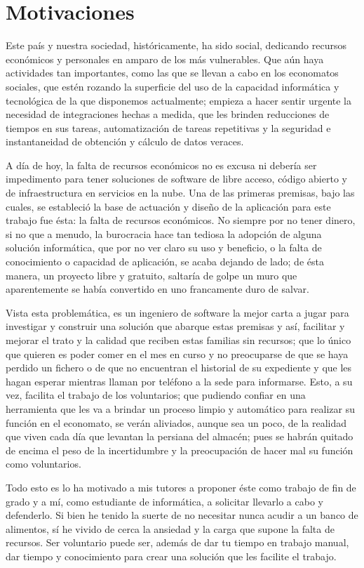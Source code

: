 \section{Motivaciones}
Este país y nuestra sociedad, históricamente, ha sido social, dedicando recursos económicos y personales en amparo de los más vulnerables. Que aún haya actividades tan importantes, como las que se llevan a cabo en los economatos sociales, que estén rozando la superficie del uso de la capacidad informática y tecnológica de la que disponemos actualmente; empieza a hacer sentir urgente la necesidad de integraciones hechas a medida, que les brinden reducciones de tiempos en sus tareas, automatización de tareas repetitivas y la seguridad e instantaneidad de obtención y cálculo de datos veraces.
\vspace{1em}
\par A día de hoy, la falta de recursos económicos no es excusa ni debería ser impedimento para tener soluciones de software de libre acceso, código abierto y de infraestructura en servicios en la nube. Una de las primeras premisas, bajo las cuales, se estableció la base de actuación y diseño de la aplicación para este trabajo fue ésta: la falta de recursos económicos. No siempre por no tener dinero, si no que a menudo, la burocracia hace tan tediosa la adopción de alguna solución informática, que por no ver claro su uso y beneficio, o la falta de conocimiento o capacidad de
aplicación, se acaba dejando de lado; de ésta manera, un proyecto libre y gratuito, saltaría de golpe un muro que aparentemente se había convertido en uno francamente duro de salvar.
\vspace{1em}
\par Vista esta problemática, es un ingeniero de software la mejor carta a jugar para investigar y construir una solución que abarque estas premisas y así, facilitar y mejorar el trato y la calidad que reciben estas familias sin recursos; que lo único que quieren es poder comer en el mes en curso y no preocuparse de que se haya perdido un fichero o de que no encuentran el historial de su expediente y que les hagan esperar mientras llaman por teléfono a la sede para informarse.
Esto, a su vez, facilita el trabajo de los voluntarios; que pudiendo confiar en una herramienta que les va a brindar un proceso limpio y automático para realizar su función en el economato, se verán aliviados, aunque sea un poco, de la realidad que viven cada día que levantan la persiana del almacén; pues se habrán quitado de encima el peso de la incertidumbre y la preocupación de hacer mal
su función como voluntarios.
\vspace{1em}
\par Todo esto es lo ha motivado a mis tutores a proponer éste como trabajo de fin de grado y a mí, como estudiante de informática, a solicitar llevarlo a cabo y defenderlo. Si bien he tenido la suerte de no necesitar nunca acudir a un banco de alimentos, sí he vivido de cerca la ansiedad y la carga que supone la falta de recursos. Ser voluntario puede ser, además de dar tu tiempo en trabajo manual, dar tiempo y conocimiento para crear una solución que les facilite el trabajo.

